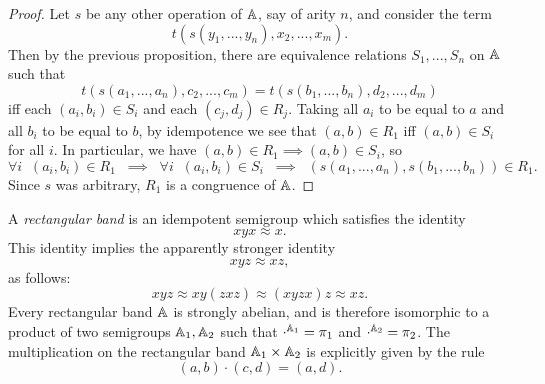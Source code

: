 \begin{appendices}
\begin{proof}
Let $s$ be any other operation of $\mathbb{A}$, say of arity $n$, and consider the term
\[
t(s(y_1, ..., y_n), x_2, ..., x_m).
\]
Then by the previous proposition, there are equivalence relations $S_1, ..., S_n$ on $\mathbb{A}$ such that
\[
t(s(a_1, ..., a_n), c_2, ..., c_m) = t(s(b_1, ..., b_n), d_2, ..., d_m)
\]
iff each $(a_i,b_i) \in S_i$ and each $(c_j,d_j) \in R_j$. Taking all $a_i$ to be equal to $a$ and all $b_i$ to be equal to $b$, by idempotence we see that $(a,b) \in R_1$ iff $(a,b) \in S_i$ for all $i$. In particular, we have $(a,b) \in R_1 \implies (a,b) \in S_i$, so
\[
\forall i \;\; (a_i,b_i) \in R_1 \;\; \implies \;\; \forall i \;\; (a_i,b_i) \in S_i \;\; \implies \;\; (s(a_1, ..., a_n), s(b_1, ..., b_n)) \in R_1.
\]
Since $s$ was arbitrary, $R_1$ is a congruence of $\mathbb{A}$.
\end{proof}

\begin{ex} A \emph{rectangular band} is an idempotent semigroup which satisfies the identity
\[
xyx \approx x.
\]
This identity implies the apparently stronger identity
\[
xyz \approx xz,
\]
as follows:
\[
xyz \approx xy(zxz) \approx (xyzx)z \approx xz.
\]
Every rectangular band $\mathbb{A}$ is strongly abelian, and is therefore isomorphic to a product of two semigroups $\mathbb{A}_1, \mathbb{A}_2$ such that $\cdot^{\mathbb{A}_1} = \pi_1$ and $\cdot^{\mathbb{A}_2} = \pi_2$. The multiplication on the rectangular band $\mathbb{A}_1\times\mathbb{A}_2$ is explicitly given by the rule
\[
(a,b)\cdot(c,d) = (a,d).
\]
\end{ex}


\end{appendices}

